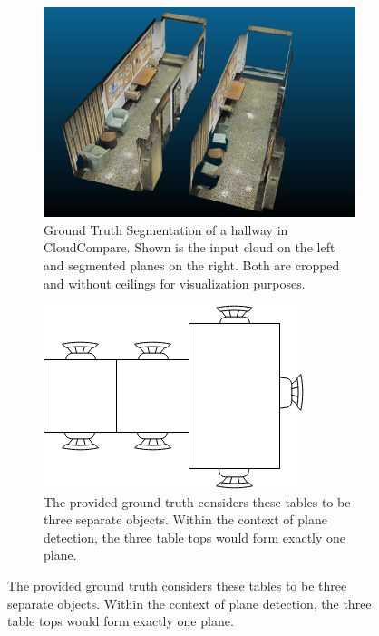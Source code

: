 \documentclass[main.tex]{subfiles}
\begin{document}
\begin{figure} [H]
    \begin{subfigure}{0.5\textwidth}
        \centering
        \includegraphics[width=.9\linewidth]{images/gtseg.png}
        \caption[Ground Truth Segmentation]{Ground Truth Segmentation of a hallway in CloudCompare. Shown is the input cloud on the left and segmented planes on the right.
            Both are cropped and without ceilings for visualization purposes.}
        \label{fig:gtseg}
    \end{subfigure}
    \begin{subfigure} {0.5\textwidth}
        \centering
        \includegraphics[width=0.9\linewidth]{images/tables.png}
        \caption[Ground Truth Table Example]{The provided ground truth considers these tables to be three separate objects. Within the context of
            plane detection, the three table tops would form exactly one plane.}
        \label{fig:tables}
    \end{subfigure}
\end{figure}
\end{document}
